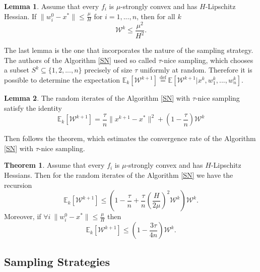 \documentclass{article}
\theoremstyle{definition}
\theoremstyle{assumption}
\theoremstyle{lemma}
\newtheorem{lemma}{Lemma}
\theoremstyle{theorem}
\newtheorem{theorem}{Theorem}
\theoremstyle{proposition}
\begin{document}
	\begin{lemma}\label{lemma:2}
		Assume that every $f_i$ is $\mu$-strongly convex and has $H$-Lipschitz Hessian. If $\|w_i^0 - x^*\| \leqslant \frac{\mu}{H}$ for $i = 1, ..., n$, then for all $k$
		\begin{equation}
			\mathcal W^k \leqslant \frac{\mu^2}{H^2}.
		\end{equation}
	\end{lemma}

	The last lemma is the one that incorporates the nature of the sampling strategy. The authors of the Algorithm \ref{SN} used so called $\tau$-nice sampling, which chooses a subset $S^{k} \subseteq \{ 1, 2, ..., n \}$ precisely of size $\tau$ uniformly at random. Therefore it is possible to determine the expectation $\mathbb E_k[\mathcal W^{k+1}] \overset{\text{def}} = \mathbb E[\mathcal W^{k+1} | x^k, w_1^k, ..., w_n^k]$.

	\begin{lemma}\label{lemma:3}
		The random iterates of the Algorithm \ref{SN} with $\tau$-nice sampling satisfy the identity
		\begin{equation}
			\mathbb E_k[\mathcal W^{k+1}] = \frac{\tau}{n} \| x^{k+1} - x^* \|^2 + \left(1 - \frac{\tau}{n}\right) \mathcal W^k
		\end{equation}
	\end{lemma}

	Then follows the theorem, which estimates the convergence rate of the Algorithm \ref{SN} with $\tau$-nice sampling.
	
	\begin{theorem} \label{theorem:1}
		Assume that every $f_i$ is $\mu$-strongly convex and has $H$-Lipschitz Hessians. Then for the random iterates of the Algorithm \ref{SN} we have the recursion
		\begin{equation}
			\mathbb E_k[\mathcal W^{k+1}] \leqslant \left( 1 - \frac{\tau}{n} + \frac{\tau}{n} \left( \frac{H}{2\mu} \right)^2 \mathcal W^k \right) \mathcal W^k.
		\end{equation}
		Moreover, if $\forall i\ \|w_i^0 - x^*\| \leqslant \frac{\mu}{H}$ then
		\begin{equation}
			\mathbb E_k[\mathcal W^{k+1}] \leqslant \left( 1 - \frac{3\tau}{4n} \right) \mathcal W^k.
		\end{equation}
	\end{theorem}
	
	
	\subsection{Sampling Strategies}
	
\end{document}

